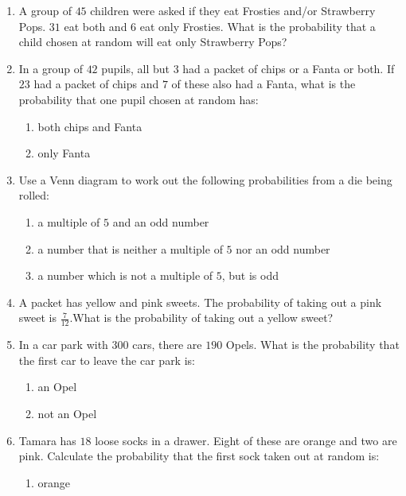 \begin{eocexercises}{}
  \begin{enumerate}[itemsep=5pt, label=\textbf{\arabic*}. ]
  \item A group of $45$ children were asked if they eat Frosties and/or
    Strawberry Pops. $31$ eat both and $6$ eat only Frosties. What is the
    probability that a child chosen at random will eat only Strawberry
    Pops?
  \item In a group of $42$ pupils, all but $3$ had a packet of chips
    or a Fanta or both. If $23$ had a packet of chips and $7$ of these
    also had a Fanta, what is the probability that one pupil chosen at
    random has:
    \begin{enumerate}[noitemsep, label=\textbf{(\alph*)} ]
    \item both chips and Fanta
    \item only Fanta
    \end{enumerate}
  \item Use a Venn diagram to work out the following probabilities
    from a die being rolled:
    \begin{enumerate}[noitemsep, label=\textbf{(\alph*)} ]
    \item a multiple of $5$ and an odd number
    \item a number that is neither a multiple of $5$ nor an odd
      number
    \item a number which is not a multiple of $5$, but is odd
    \end{enumerate}
  \item A packet has yellow and pink sweets. The probability of taking
    out a pink sweet is $\frac{7}{12}$.What is the probability of taking out a yellow sweet?
  \item In a car park with $300$ cars, there are $190$ Opels. What is the
    probability that the first car to leave the car park is:
    \begin{enumerate}[noitemsep, label=\textbf{(\alph*)} ]
    \item an Opel
    \item not an Opel
    \end{enumerate}
  \item Tamara has $18$ loose socks in a drawer. Eight of these are
    orange and two are pink. Calculate the probability that the first
    sock taken out at random is:
    \begin{enumerate}[noitemsep, label=\textbf{(\alph*)} ]
    \item orange

\end{enumerate}
\end{enumerate}
\end{eocexercises}
